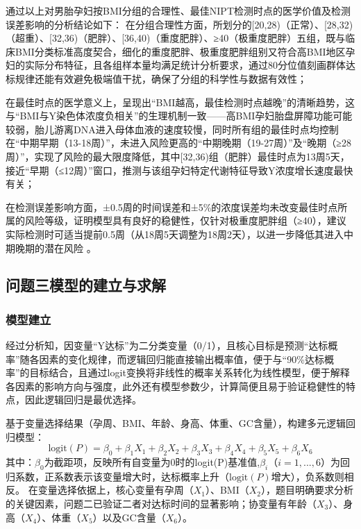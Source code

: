 \documentclass[withoutpreface,bwprint]{cumcmthesis} %
\begin{document}
通过以上对男胎孕妇按BMI分组的合理性、最佳NIPT检测时点的医学价值及检测误差影响的分析结论如下：
在分组合理性方面，所划分的[20,28)（正常）、[28,32)（超重）、[32,36)（肥胖）、[36,40)（重度肥胖）、≥40（极重度肥胖）五组，既与临床BMI分类标准高度契合，细化的重度肥胖、极重度肥胖组别又符合高BMI地区孕妇的实际分布特征，且各组样本量均满足统计分析要求，通过80分位值刻画群体达标规律还能有效避免极端值干扰，确保了分组的科学性与数据有效性；

在最佳时点的医学意义上，呈现出“BMI越高，最佳检测时点越晚”的清晰趋势，这与“BMI与Y染色体浓度负相关”的生理机制一致——高BMI孕妇胎盘屏障功能可能较弱，胎儿游离DNA进入母体血液的速度较慢，同时所有组的最佳时点均控制在“中期早期（13-18周）”，未进入风险更高的“中期晚期（19-27周）”及“晚期（≥28周）”，实现了风险的最大限度降低，其中[32,36)组（肥胖）最佳时点为13周5天，接近“早期（≤12周）”窗口，推测与该组孕妇特定代谢特征导致Y浓度增长速度最快有关；

在检测误差影响方面，±0.5周的时间误差和±5\%的浓度误差均未改变最佳时点所属的风险等级，证明模型具有良好的稳健性，仅针对极重度肥胖组（≥40），建议实际检测时可适当提前0.5周（从18周5天调整为18周2天），以进一步降低其进入中期晚期的潜在风险 。




\subsection{问题三模型的建立与求解}
\subsubsection{模型建立}
经过分析知，因变量“Y达标”为二分类变量（0/1），且核心目标是预测“达标概率”随各因素的变化规律，而逻辑回归能直接输出概率值，便于与“90\%达标概率”的目标结合，且通过logit变换将非线性的概率关系转化为线性模型，便于解释各因素的影响方向与强度，此外还有模型参数少，计算简便且易于验证稳健性的特点，因此逻辑回归是最优选择。

基于变量选择结果（孕周、BMI、年龄、身高、体重、GC含量），构建多元逻辑回归模型：  
\begin{equation}
    \text{logit}(P) = \beta_0 + \beta_1X_1 + \beta_2X_2 + \beta_3X_3 + \beta_4X_4 + \beta_5X_5 + \beta_6X_6
\end{equation}
其中：$\beta_0$为截距项，反映所有自变量为0时的logit(P)基准值,$\beta_i$（$i=1,...,6$）为回归系数，正系数表示该变量增大时，达标概率上升（$\text{logit}(P)$增大），负系数则相反。  
在变量选择依据上，核心变量有孕周（$X_1$）、BMI（$X_2$），题目明确要求分析的关键因素，问题二已验证二者对达标时间的显著影响；协变量有年龄（$X_3$）、身高（$X_4$）、体重（$X_5$）以及GC含量（$X_6$）。  
\end{document}
